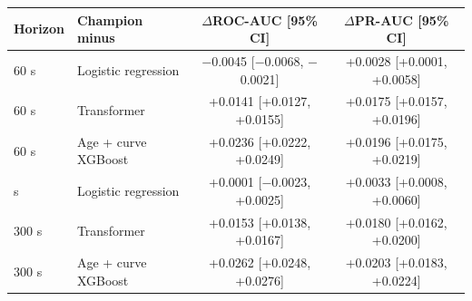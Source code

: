 \begin{tabular}{llcc}
\toprule
Horizon & Champion minus & $\Delta$ROC-AUC [95\% CI] & $\Delta$PR-AUC [95\% CI] \\
\midrule
60 s & Logistic regression & $-$0.0045 [$-$0.0068, $-$0.0021] & +0.0028 [+0.0001, +0.0058] \\
60 s & Transformer & +0.0141 [+0.0127, +0.0155] & +0.0175 [+0.0157, +0.0196] \\
60 s & Age + curve XGBoost & +0.0236 [+0.0222, +0.0249] & +0.0196 [+0.0175, +0.0219] \\
\addlinespace
300 s & Logistic regression & +0.0001 [$-$0.0023, +0.0025] & +0.0033 [+0.0008, +0.0060] \\
300 s & Transformer & +0.0153 [+0.0138, +0.0167] & +0.0180 [+0.0162, +0.0200] \\
300 s & Age + curve XGBoost & +0.0262 [+0.0248, +0.0276] & +0.0203 [+0.0183, +0.0224] \\
\bottomrule
\end{tabular}
